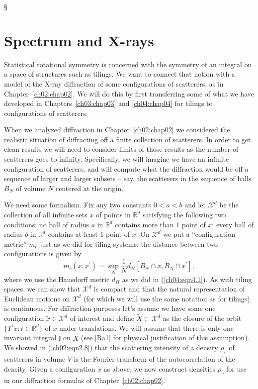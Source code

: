 \documentclass[reqno]{stml-l}
\theoremstyle{plain}
\theoremstyle{definition}
\numberwithin{equation}{chapter}
\begin{document}
\S \section{Spectrum and X-rays}\label{ch04:sec2}

Statistical rotational symmetry is concerned with the symmetry of an integral on a space of structures such as tilings. We want to connect that notion with a model of the $\mathrm{X}$-ray diffraction of some configurations of scatterers, as in Chapter~\ref{ch02:chap02}. We will do this by first transferring some of what we have developed in Chapters~\ref{ch03:chap03} and \ref{ch04:chap04} for tilings to configurations of scatterers.

When we analyzed diffraction in Chapter~\ref{ch02:chap02} we considered the realistic situation of diffracting off a finite collection of scatterers. In order to get clean results we will need to consider limits of those results as the number of scatterers goes to infinity. Specifically, we will imagine we have an infinite configuration of scatterers, and will compute what the diffraction would be off a sequence of larger and larger subsets -- say, the scatterers in the sequence of balls $B_{N}$ of volume $N$ centered at the origin.

We need some formalism. Fix any two constants $0<a<b$ and let $\mathcal{X}^{d}$ be the collection of all infinite sets $x$ of points in $\mathbb{R}^{d}$ satisfying the following two conditions: no ball of radius $a$ in $\mathbb{R}^{d}$ contains more than 1 point of $x$; every ball of radius $b$ in $\mathbb{R}^{d}$ contains at least 1 point of $x$. On $\mathcal{X}^{d}$ we put a ``configuration metric'' $m_{c}$ just as we did for tiling systems: the distance between two configurations is given by
\begin{equation}\label{ch04:eqn4.16}
m_{c}(x, x^{\prime})=\sup_{N}\frac{1}{N}d_{H}[B_{N}\cap x, B_{N}\cap x^{\prime}],
\end{equation}
where we use the Hausdorff metric $d_{H}$ as we did in (\ref{ch04:eqn4.1}). As with tiling spaces, we can show that $\mathcal{X}^{d}$ is compact and that the natural representation of Euclidean motions on $\mathcal{X}^{d}$ (for which we will use the same notation as for tilings) is continuous. For diffraction purposes let's assume we have some one configuration $\tilde{x}\in \mathcal{X}^{d}$ of interest and define $\tilde{X}\subset \mathcal{X}^{d}$ as the closure of the orbit $\{T^{t}\tilde{x}:t\in \mathbb{R}^{d}\}$ of $\tilde{x}$ under translations. We will assume that there is only one invariant integral $\mathbb{I}$ on $\tilde{X}$ (see [Ra1] for physical justification of this assumption). We showed in (\ref{ch02:eqn2.8}) that the scattering intensity of a density $\rho_{_{V}}$ of scatterers in volume $V$ is the Fourier transform of the autocorrelation of the density. Given a configuration $\tilde{x}$ as above, we now construct densities $\rho_{_{V}}$ for use in our diffraction formulas of Chapter~\ref{ch02:chap02}.
\end{document}

